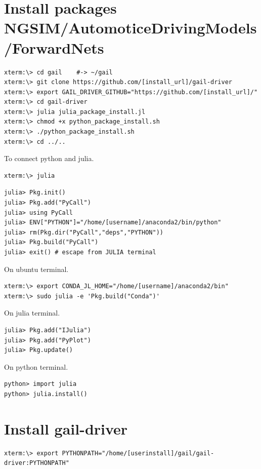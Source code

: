 \documentclass[openany,11pt]{report}%
\begin{document}
\section{Install packages NGSIM/AutomoticeDrivingModels/ForwardNets}



\begin{lstlisting}[style=DOS]
xterm:\> cd gail    #-> ~/gail
xterm:\> git clone https://github.com/[install_url]/gail-driver
xterm:\> export GAIL_DRIVER_GITHUB="https://github.com/[install_url]/"
xterm:\> cd gail-driver
xterm:\> julia julia_package_install.jl
xterm:\> chmod +x python_package_install.sh
xterm:\> ./python_package_install.sh
xterm:\> cd ../..
\end{lstlisting}


To connect python and julia.

\begin{lstlisting}[style=DOS]
xterm:\> julia
\end{lstlisting}
\begin{lstlisting}[style=DOS]
julia> Pkg.init()
julia> Pkg.add("PyCall") 
julia> using PyCall
julia> ENV["PYTHON"]="/home/[username]/anaconda2/bin/python"
julia> rm(Pkg.dir("PyCall","deps","PYTHON"))
julia> Pkg.build("PyCall")
julia> exit() # escape from JULIA terminal 
\end{lstlisting}

On ubuntu terminal.
\begin{lstlisting}[style=DOS]
xterm:\> export CONDA_JL_HOME="/home/[username]/anaconda2/bin"
xterm:\> sudo julia -e 'Pkg.build("Conda")'
\end{lstlisting}

On julia terminal.
\begin{lstlisting}[style=DOS]
julia> Pkg.add("IJulia")
julia> Pkg.add("PyPlot")
julia> Pkg.update()
\end{lstlisting}

On python terminal.
\begin{lstlisting}[style=DOS]
python> import julia
python> julia.install()
\end{lstlisting}



\section{Install gail-driver}


\begin{lstlisting}[style=DOS]
xterm:\> export PYTHONPATH="/home/[userinstall]/gail/gail-driver:PYTHONPATH"
\end{lstlisting}
\end{document}
